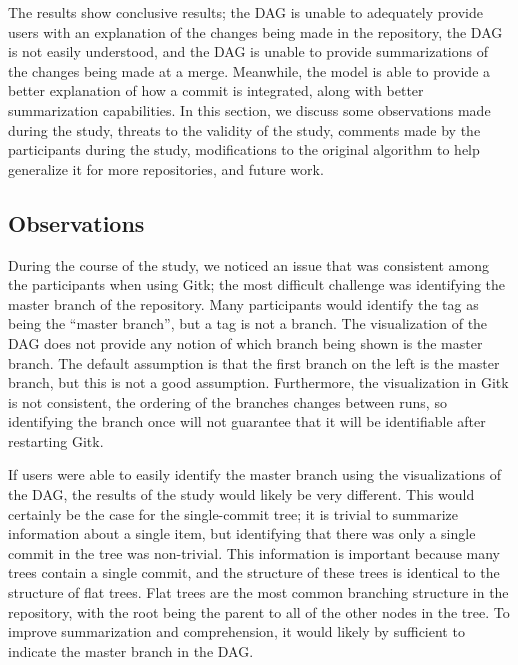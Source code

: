 

The results show conclusive results; the DAG is unable to adequately
provide users with an explanation of the changes being made in the
repository, the DAG is not easily understood, and the DAG is unable to
provide summarizations of the changes being made at a merge. Meanwhile,
the \mt model is able to provide a better explanation of how a commit is
integrated, along with better summarization capabilities. In this
section, we discuss some observations made during the study, threats to
the validity of the study, comments made by the participants during the
study, modifications to the original algorithm to help generalize it for
more repositories, and future work.

\subsection{Observations}
\label{sub:observations}



During the course of the study, we noticed an issue that was consistent
among the participants when using Gitk; the most difficult challenge was
identifying the master branch of the repository. Many participants would
identify the tag as being the ``master branch'', but a tag is not a
branch. The visualization of the DAG does not provide any notion of
which branch being shown is the master branch. The default assumption is
that the first branch on the left is the master branch, but this is not
a good assumption. Furthermore, the visualization in Gitk is not
consistent, the ordering of the branches changes between runs, so
identifying the branch once will not guarantee that it will be
identifiable after restarting Gitk.

If users were able to easily identify the master branch using the
visualizations of the DAG, the results of the study would likely be very
different. This would certainly be the case for the single-commit tree;
it is trivial to summarize information about a single item, but
identifying that there was only a single commit in the tree was
non-trivial. This information is important because many trees contain a
single commit, and the structure of these trees is identical to the
structure of flat trees. Flat trees are the most common branching
structure in the repository, with the root being the parent to all of
the other nodes in the tree. To improve summarization and comprehension,
it would likely by sufficient to indicate the master branch in the DAG.

